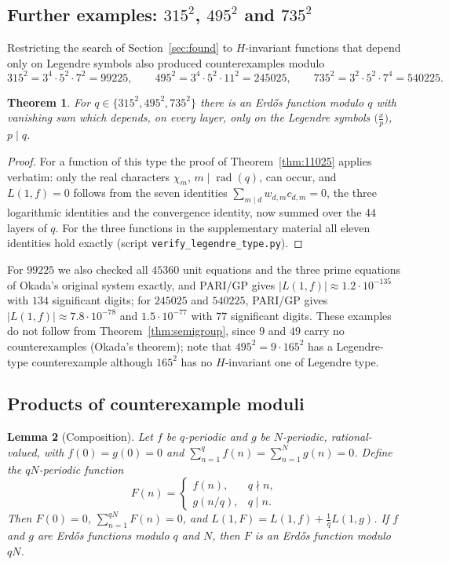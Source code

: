 \documentclass[11pt]{amsart}
\newtheorem{theorem}{Theorem}[section]
\newtheorem{lemma}[theorem]{Lemma}
\theoremstyle{definition}
\theoremstyle{remark}
\DeclareMathOperator{\rad}{rad}
\numberwithin{equation}{section}
\begin{document}
\subsection{\texorpdfstring{Further examples: $315^2$, $495^2$ and $735^2$}{Further examples}}
Restricting the search of Section~\ref{sec:found} to $H$-invariant functions that depend only on Legendre symbols also produced counterexamples modulo
\[
315^2=3^4\cdot5^2\cdot7^2=99225,\qquad 495^2=3^4\cdot5^2\cdot11^2=245025,\qquad 735^2=3^2\cdot5^2\cdot7^4=540225 .
\]
\begin{theorem}\label{thm:more}
For $q\in\{315^2,495^2,735^2\}$ there is an Erd\H{o}s function modulo $q$ with vanishing sum which depends, on every layer, only on the Legendre symbols $\bigl(\frac xp\bigr)$, $p\mid q$.
\end{theorem}
\begin{proof}
For a function of this type the proof of Theorem~\ref{thm:11025} applies verbatim: only the real characters $\chi_m$, $m\mid\rad(q)$, can occur, and $L(1,f)=0$ follows from the seven identities $\sum_{m\mid d}w_{d,m}c_{d,m}=0$, the three logarithmic identities and the convergence identity, now summed over the $44$ layers of $q$.
For the three functions in the supplementary material all eleven identities hold exactly (script \texttt{verify\_legendre\_type.py}).
\end{proof}
For $99225$ we also checked all $45360$ unit equations and the three prime equations of Okada's original system exactly, and PARI/GP gives $|L(1,f)|\approx1.2\cdot10^{-135}$ with $134$ significant digits; for $245025$ and $540225$, PARI/GP gives $|L(1,f)|\approx7.8\cdot10^{-78}$ and $1.5\cdot10^{-77}$ with $77$ significant digits.
These examples do not follow from Theorem~\ref{thm:semigroup}, since $9$ and $49$ carry no counterexamples (Okada's theorem); note that $495^2=9\cdot165^2$ has a Legendre-type counterexample although $165^2$ has no $H$-invariant one of Legendre type.

\subsection{Products of counterexample moduli}
\begin{lemma}[Composition]\label{lem:compose}
Let $f$ be $q$-periodic and $g$ be $N$-periodic, rational-valued, with $f(0)=g(0)=0$ and $\sum_{n=1}^qf(n)=\sum_{n=1}^Ng(n)=0$.
Define the $qN$-periodic function
\[
F(n)=\begin{cases}f(n),& q\nmid n,\\ g(n/q),& q\mid n.\end{cases}
\]
Then $F(0)=0$, $\sum_{n=1}^{qN}F(n)=0$, and $L(1,F)=L(1,f)+\frac1qL(1,g)$.
If $f$ and $g$ are Erd\H{o}s functions modulo $q$ and $N$, then $F$ is an Erd\H{o}s function modulo $qN$.
\end{lemma}
\end{document}
